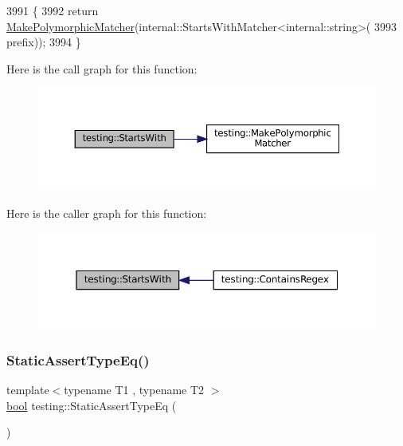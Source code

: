 \begin{DoxyCode}
3991                                              \{
3992   \textcolor{keywordflow}{return} \hyperlink{namespacetesting_a667ca94f190ec2e17ee2fbfdb7d3da04}{MakePolymorphicMatcher}(internal::StartsWithMatcher<internal::string>(
3993       prefix));
3994 \}
\end{DoxyCode}
Here is the call graph for this function\+:
\nopagebreak
\begin{figure}[H]
\begin{center}
\leavevmode
\includegraphics[width=350pt]{namespacetesting_ae0502232432b1fe8361d296c6de6beda_cgraph}
\end{center}
\end{figure}
Here is the caller graph for this function\+:
\nopagebreak
\begin{figure}[H]
\begin{center}
\leavevmode
\includegraphics[width=350pt]{namespacetesting_ae0502232432b1fe8361d296c6de6beda_icgraph}
\end{center}
\end{figure}
\mbox{\label{namespacetesting_a661e70fc6afeb5c085eed3716aa45059}} 
\subsubsection{\texorpdfstring{Static\+Assert\+Type\+Eq()}{StaticAssertTypeEq()}}
{\footnotesize\ttfamily template$<$typename T1 , typename T2 $>$ \\
\hyperlink{classbool}{bool} testing\+::\+Static\+Assert\+Type\+Eq (\begin{DoxyParamCaption}{ }\end{DoxyParamCaption})}



